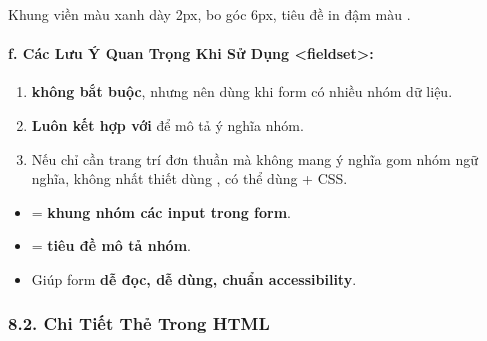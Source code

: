 \begin{browserWindow}
\begin{tcolorbox}[
    enhanced, colback=white, colframe=primaryBlue, boxrule=1.5pt, arc=6pt,
    top=10pt, bottom=10pt, left=10pt, right=10pt,
    coltitle=darkText,
    title={\sffamily\bfseries\color{darkText} Thông tin cá nhân},
    attach boxed title to top left={xshift=12pt, yshift=-7pt},
    boxed title style={colback=white, colframe=white, boxrule=0pt, left=4pt, right=4pt, top=0pt, bottom=0pt}
]
\sffamily\small
\textcolor{darkText}{Khung viền màu xanh  dày 2px, bo góc 6px, tiêu đề in đậm màu .}
\end{tcolorbox}
\end{browserWindow}

\paragraph{f. Các Lưu Ý Quan Trọng Khi Sử Dụng <fieldset>:}
\begin{enumerate}[leftmargin=1.5em, itemsep=3pt, parsep=0pt]
    \item {} \textbf{không bắt buộc}, nhưng nên dùng khi form có nhiều nhóm dữ liệu.
    \item \textbf{Luôn kết hợp với } để mô tả ý nghĩa nhóm.
    \item Nếu chỉ cần trang trí đơn thuần mà không mang ý nghĩa gom nhóm ngữ nghĩa, không nhất thiết dùng , có thể dùng  + CSS.
\end{enumerate}

\begin{tipBox}
\begin{itemize}[leftmargin=1.5em, itemsep=2pt, parsep=0pt]
    \item {} = \textbf{khung nhóm các input trong form}.
    \item {} = \textbf{tiêu đề mô tả nhóm}.
    \item Giúp form \textbf{dễ đọc, dễ dùng, chuẩn accessibility}.
\end{itemize}
\end{tipBox}

\subsubsection{8.2. Chi Tiết Thẻ  Trong HTML}

